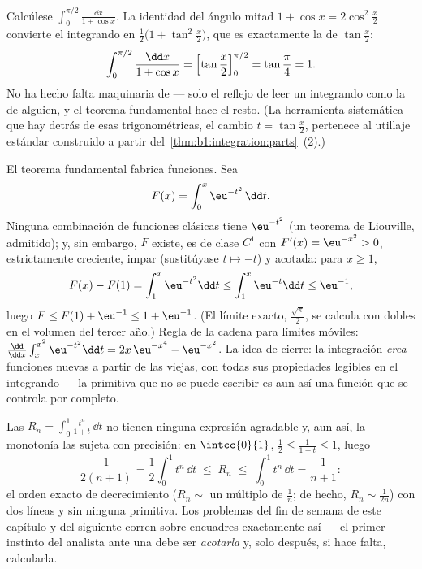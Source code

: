 \begin{example}\label{ex:b1:integration:halfangle}
Calcúlese $\displaystyle\int_0^{\pi/2} \frac{\dd x}{1 + \cos x}$. La
identidad del ángulo mitad $1 + \cos x = 2\cos^2\frac x2$ convierte el
integrando en $\frac{1}{2}\bigl(1 + \tan^2\frac x2\bigr)$, que es
exactamente la  de $\tan\frac x2$:
\[
\int_0^{\pi/2} \frac{\dd x}{1 + \cos x}
= \Bigl[\tan\frac x2\Bigr]_0^{\pi/2} = \tan\frac\pi4 = 1 .
\]
No ha hecho falta maquinaria de  --- solo el
reflejo de leer un integrando como la  de alguien, y el
teorema fundamental hace el resto. (La herramienta sistemática que hay
detrás de esas  trigonométricas, el cambio
$t = \tan\frac x2$, pertenece al utillaje estándar construido a partir
del~\cref{thm:b1:integration:parts}~(2).)
\end{example}

\begin{example}\label{ex:b1:integration:definedby}
El teorema fundamental fabrica funciones. Sea
\[
F(x) = \int_0^x \eu^{-t^2}\,\dd t .
\]
Ninguna combinación de funciones clásicas tiene 
$\eu^{-t^2}$ (un teorema de Liouville, admitido); y, sin embargo, $F$
existe, es de clase $C^1$ con $F'(x) = \eu^{-x^2} > 0$,
estrictamente creciente, impar (sustitúyase $t \mapsto -t$) y
acotada: para $x \geq 1$,
\[
F(x) - F(1) = \int_1^x \eu^{-t^2}\dd t
\leq \int_1^x \eu^{-t}\dd t \leq \eu^{-1} ,
\]
luego $F \leq F(1) + \eu^{-1} \leq 1 + \eu^{-1}$. (El límite exacto,
$\frac{\sqrt\pi}{2}$, se calcula con  dobles en el volumen
del tercer año.) Regla de la cadena para límites móviles:
$\frac{\dd}{\dd x}\int_x^{x^2} \eu^{-t^2}\dd t =
2x\,\eu^{-x^4} - \eu^{-x^2}$. La idea de cierre: la integración
\emph{crea} funciones nuevas a partir de las viejas, con todas sus
propiedades legibles en el integrando --- la primitiva que no se puede
escribir es aun así una función que se controla por completo.
\end{example}

\begin{example}\label{ex:b1:integration:estimate}
Las  $R_n = \int_0^1 \frac{t^n}{1 + t}\,\dd t$ no tienen
ninguna expresión  agradable y, aun así, la monotonía las
sujeta con precisión: en $\intcc{0}{1}$,
$\frac12 \leq \frac{1}{1+t} \leq 1$, luego
\[
\frac{1}{2(n+1)} = \frac12\int_0^1 t^n\,\dd t
\;\leq\; R_n \;\leq\; \int_0^1 t^n \,\dd t = \frac{1}{n+1} :
\]
el orden exacto de decrecimiento ($R_n \sim$ un múltiplo de
$\frac1n$; de hecho, $R_n \sim \frac{1}{2n}$) con dos líneas y sin
ninguna primitiva. Los problemas del fin de semana de este capítulo y
del siguiente corren sobre encuadres exactamente así --- el primer
instinto del analista ante una  debe ser \emph{acotarla} y,
solo después, si hace falta, calcularla.
\end{example}

